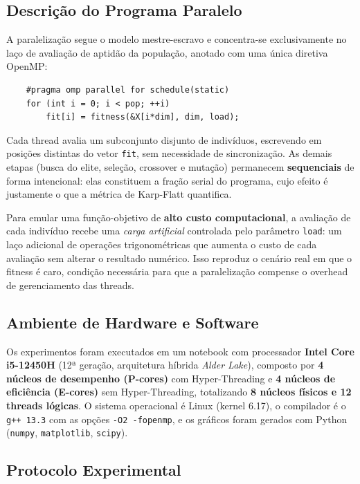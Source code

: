 \documentclass[12pt]{article}
\begin{document}
\subsection{Descrição do Programa Paralelo}

A paralelização segue o modelo mestre-escravo e concentra-se exclusivamente no
laço de avaliação de aptidão da população, anotado com uma única diretiva
OpenMP:

\begin{verbatim}
    #pragma omp parallel for schedule(static)
    for (int i = 0; i < pop; ++i)
        fit[i] = fitness(&X[i*dim], dim, load);
\end{verbatim}

Cada thread avalia um subconjunto disjunto de indivíduos, escrevendo em
posições distintas do vetor \texttt{fit}, sem necessidade de sincronização. As
demais etapas (busca do elite, seleção, crossover e mutação) permanecem
\textbf{sequenciais} de forma intencional: elas constituem a fração serial do
programa, cujo efeito é justamente o que a métrica de Karp-Flatt quantifica.

Para emular uma função-objetivo de \textbf{alto custo computacional}, a
avaliação de cada indivíduo recebe uma \emph{carga artificial} controlada pelo
parâmetro \texttt{load}: um laço adicional de operações trigonométricas que
aumenta o custo de cada avaliação sem alterar o resultado numérico. Isso
reproduz o cenário real em que o fitness é caro, condição necessária para que a
paralelização compense o overhead de gerenciamento das threads.

\subsection{Ambiente de Hardware e Software}

Os experimentos foram executados em um notebook com processador
\textbf{Intel Core i5-12450H} (12ª geração, arquitetura híbrida
\emph{Alder Lake}), composto por \textbf{4 núcleos de desempenho (P-cores)}
com Hyper-Threading e \textbf{4 núcleos de eficiência (E-cores)} sem
Hyper-Threading, totalizando \textbf{8 núcleos físicos e 12 threads lógicas}.
O sistema operacional é Linux (kernel 6.17), o compilador é o
\texttt{g++ 13.3} com as opções \texttt{-O2 -fopenmp}, e os gráficos foram
gerados com Python (\texttt{numpy}, \texttt{matplotlib}, \texttt{scipy}).

\subsection{Protocolo Experimental}
\end{document}
